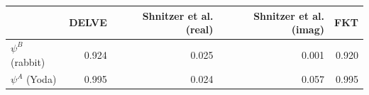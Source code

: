 \begin{tabular}{lrrrr}
\toprule
 & DELVE & Shnitzer et al. (real) & Shnitzer et al. (imag) & FKT \\
\midrule
$\psi^B$ (rabbit) & 0.924 & 0.025 & 0.001 & 0.920 \\
$\psi^A$ (Yoda) & 0.995 & 0.024 & 0.057 & 0.995 \\
\bottomrule
\end{tabular}
